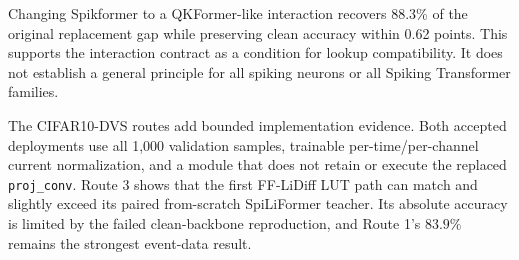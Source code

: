 \begin{table}[t]
\centering
\footnotesize
{}
\caption{Robustness and contract intervention (Acc@1, \%). The modified
Spikformer row is an architecture ablation, not evidence that unmodified
Spikformer is near-losslessly replaced. Under matched controls it reaches
85.83 with shuffled address and 86.18 with token/channel, so fine-address
superiority beyond coarse state remains unresolved.}
\label{tab:contract_transfer}
\end{table}

Changing Spikformer to a QKFormer-like interaction recovers 88.3\% of the
original replacement gap while preserving clean accuracy within 0.62 points.
This supports the interaction contract as a condition for lookup compatibility.
It does not establish a general principle for all spiking neurons or all
Spiking Transformer families.

The CIFAR10-DVS routes add bounded implementation evidence. Both accepted
deployments use all 1,000 validation samples, trainable per-time/per-channel
current normalization, and a module that does not retain or execute the
replaced \texttt{proj\_conv}. Route 3 shows that the first FF-LiDiff LUT path
can match and slightly exceed its paired from-scratch SpiLiFormer teacher.
Its absolute accuracy is limited by the failed clean-backbone reproduction,
and Route 1's $83.9\%$ remains the strongest event-data result.

